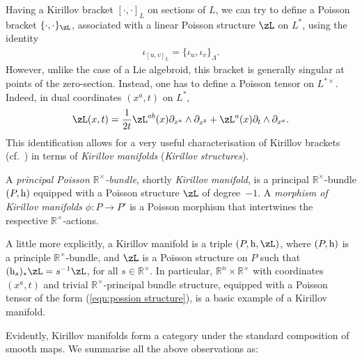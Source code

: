 \documentclass[pdftex]{sigma}
\newcommand{\rmh}{\textnormal{h}}
\newcommand{\R}{{\mathbb R}}
\newcommand{\we}{\wedge}
\newcommand{\pa}{\partial}
\newcommand{\ti}{\times}
\def\Rt{{\R^\times}}
\numberwithin{equation}{section}
\begin{document}
Having a Kirillov bracket $[\cdot,\cdot]_L$ on sections of $L$, we can try to def\/ine a Poisson bracket $\{\cdot,\cdot\}_\zL$, associated with a linear Poisson structure $\zL$ on $L^*$, using the identity
\begin{gather}\label{e1}
\iota_{[u, v]_{L}} = \{\iota_{u}, \iota_{v}\}_{\Lambda}.
\end{gather}
However, unlike the case of a Lie algebroid, this bracket is generally singular at points of the zero-section. Instead, one has to def\/ine a Poisson tensor on $L^{*\ti}$. Indeed, in dual coordinates $(x^a,t)$ on $L^*$,
\begin{gather}\label{eqn:possion structure}
\zL(x,t)=\frac{1}{2t}\zL^{ab}(x)\pa_{x^a}\we\pa_{x^b}+\zL^a(x)\pa_t\we\pa_{x^a}.
\end{gather}
This identif\/ication allows for a very useful characterisation of Kirillov brackets (cf.~\cite{Grabowski2013, Marle:1991}) in terms of \emph{Kirillov manifolds} (\emph{Kirillov structures}).

\begin{Definition} A \emph{principal Poisson $\R^\ti$-bundle}, shortly \emph{Kirillov manifold}, is a principal $\R^\ti$-bundle $(P,\rmh)$ equipped with a Poisson structure $\zL$ of degree~$-1$. A \emph{morphism of Kirillov manifolds} $\phi\colon P\rightarrow P'$ is a Poisson morphism that intertwines the respective $\R^\ti$-actions.
\end{Definition}

A little more explicitly, a Kirillov manifold is a triple $(P, \rmh, \zL)$, where $(P, \rmh)$ is a principle $\R^\times$-bundle, and $\zL$ is a Poisson structure on $P$ such that $(\rmh_s)_* \zL = s^{-1}\zL$, for all $s \in \R^\times$. In particular, $\R^n\ti\R^\ti$ with coordinates $(x^a,t)$ and trivial $\Rt$-principal bundle structure, equipped with a Poisson tensor of the form (\ref{eqn:possion structure}), is a basic example of a Kirillov manifold.\par

Evidently, Kirillov manifolds form a category under the standard composition of smooth maps. We summarise all the above observations as:
\end{document}
